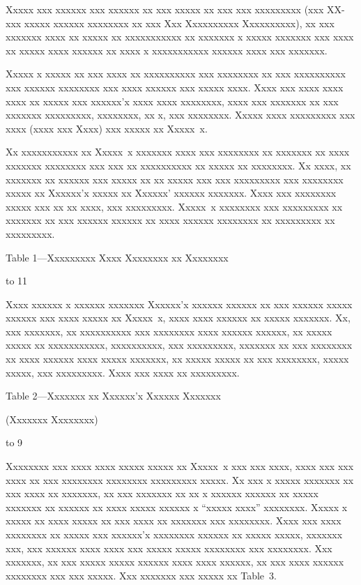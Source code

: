 Xxxxx xxx xxxxxx xxx xxxxxx xx xxx xxxxx xx xxx xxx xxxxxxxxx (xxx XX-xxx
xxxxx xxxxxx xxxxxxxx xx xxx Xxx Xxxxxxxxxx Xxxxxxxxxx), xx xxx xxxxxxx xxxx
xx xxxxx xx xxxxxxxxxxx xx xxxxxxx x xxxxx xxxxxxx xxx xxxx xx xxxxx xxxx
xxxxxx xx xxxx x xxxxxxxxxxx xxxxxx xxxx xxx xxxxxxx.

Xxxxx x xxxxx xx xxx xxxx xx xxxxxxxxxx xxx xxxxxxxx xx xxx xxxxxxxxxx xxx
xxxxxx xxxxxxxx xxx xxxx xxxxxx xxx xxxxx xxxx. Xxxx xxx xxxx xxxx xxxx xx
xxxxx xxx xxxxxx'x xxxx xxxx xxxxxxxx, xxxx {xxx xxxxxxx} xx xxx xxxxxxx
xxxxxxxxx, xxxxxxxx, xx x, xxx xxxxxxxx. Xxxxx xxxx xxxxxxxxx xxx xxxx (xxxx
xxx Xxxx) xxx xxxxx xx Xxxxx~x.

Xx xxxxxxxxxxx xx Xxxxx~x xxxxxxx xxxx xxx xxxxxxxx xx xxxxxxx xx xxxx xxxxxxx
xxxxxxxx xxx xxx xx xxxxxxxxxx xx xxxxx xx xxxxxxxx. Xx xxxx, xx xxxxxxx xx
xxxxxx xxx xxxxx xx xx xxxxx xxx xxx xxxxxxxxx xxx xxxxxxxx xxxxx xx Xxxxxx'x
xxxxx xx Xxxxxx' xxxxxx xxxxxxx. Xxxx xxx xxxxxxxx xxxxx xxx xx xx xxxx, xxx
xxxxxxxxx. Xxxxx~x xxxxxxxx xxx xxxxxxxxx xx xxxxxxx xx xxx xxxxxx xxxxxx xx
xxxx xxxxxx xxxxxxxx xx xxxxxxxxx xx xxxxxxxxx.


\singlecolumn
\centerline{Table 1---Xxxxxxxxx Xxxx Xxxxxxxx xx Xxxxxxxx}
\smallbreak
\line \bgroup \hss
  \vbox to 11\baselineskip{}
\hss \egroup
\doublecolumns


Xxxx xxxxxx x xxxxxx xxxxxxx Xxxxxx'x xxxxxx xxxxxx xx xxx xxxxxx xxxxx xxxxxx
xxx xxxx xxxxx xx Xxxxx~x, xxxx xxxx xxxxxx xx xxxxx xxxxxxx. Xx, xxx xxxxxxx,
xx xxxxxxxxxx xxx xxxxxxxx xxxx xxxxxx xxxxxx, xx xxxxx xxxxx xx xxxxxxxxxxx,
xxxxxxxxxx, xxx xxxxxxxxx, xxxxxxx xx xxx xxxxxxxx xx xxxx xxxxxx xxxx xxxxx
xxxxxxx, xx xxxxx xxxxx xx xxx xxxxxxxx, xxxxx xxxxx, xxx xxxxxxxxx. Xxxx xxx
xxxx xx xxxxxxxxx.

\medskip\bigskip
\centerline{Table 2---Xxxxxxx xx Xxxxxx'x Xxxxxx Xxxxxxx}
\nobreak
\centerline{(Xxxxxxx Xxxxxxxx)}
\smallbreak
\line \bgroup \hss
  \vbox to 9\baselineskip{}
\hss \egroup

Xxxxxxxx xxx xxxx xxxx xxxxx xxxxx xx Xxxxx~x xxx xxx xxxx, xxxx xxx xxx xxxx
xx xxx xxxxxxxx xxxxxxxx xxxxxxxxx xxxxx. Xx xxx x xxxxx xxxxxxx xx xxx xxxx
xx xxxxxxx, xx xxx xxxxxxx xx xx x xxxxxx xxxxxx xx xxxxx xxxxxxx xx xxxxxx xx
xxxx xxxxx xxxxxx x ``xxxxx xxxx'' xxxxxxxx. Xxxxx x xxxxx xx xxxx xxxxx xx
xxx xxxx xx xxxxxxx xxx xxxxxxxx. Xxxx xxx xxxx xxxxxxxx xx xxxxx xxx xxxxxx'x
xxxxxxxx xxxxxx xx xxxxx xxxxx, xxxxxxx xxx, xxx xxxxxx xxxx xxxx xxx xxxxx
xxxxx xxxxxxxx xxx xxxxxxxx. Xxx xxxxxxx, xx xxx xxxxx xxxxx xxxxxx xxxx xxxx
xxxxxx, xx xxx xxxx xxxxxx xxxxxxxx xxx xxx xxxxx. Xxx xxxxxxx xxx xxxxx xx
Table~3.


